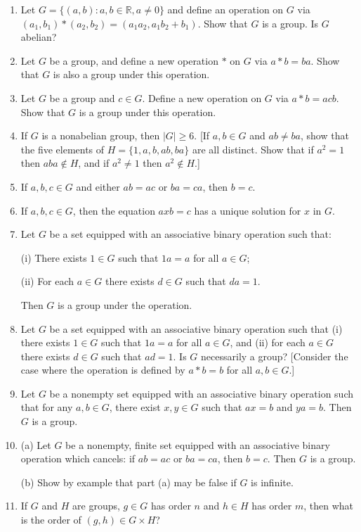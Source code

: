 \documentclass[leqno]{book}
\begin{document}
\begin{enumerate}
\item Let $G=\{(a,b):a,b\in\mathbb R,a\ne 0\}$ and define an operation on $G$ via $(a_1,b_1)*(a_2,b_2)=(a_1a_2,a_1b_2+b_1)$.  Show that $G$ is a group.  Is $G$ abelian?

\item Let $G$ be a group, and define a new operation $*$ on $G$ via $a*b=ba$.  Show that $G$ is also a group under this operation.

\item Let $G$ be a group and $c\in G$.  Define a new operation on $G$ via $a*b=acb$.  Show that $G$ is a group under this operation.

\item If $G$ is a nonabelian group, then $|G|\geqslant 6$.  [If $a,b\in G$ and $ab\ne ba$, show that the five elements of $H=\{1,a,b,ab,ba\}$ are all distinct.  Show that if $a^2=1$ then $aba\notin H$, and if $a^2\ne 1$ then $a^2\notin H$.]

\item If $a,b,c\in G$ and either $ab=ac$ or $ba=ca$, then $b=c$.

\item If $a,b,c\in G$, then the equation $axb=c$ has a unique solution for $x$ in $G$.

\item Let $G$ be a set equipped with an associative binary operation such that:

(i) There exists $1\in G$ such that $1a=a$ for all $a\in G$;

(ii) For each $a\in G$ there exists $d\in G$ such that $da=1$.

Then $G$ is a group under the operation.

\item Let $G$ be a set equipped with an associative binary operation such that (i) there exists $1\in G$ such that $1a=a$ for all $a\in G$, and (ii) for each $a\in G$ there exists $d\in G$ such that $ad=1$.  Is $G$ necessarily a group?  [Consider the case where the operation is defined by $a*b=b$ for all $a,b\in G$.]

\item Let $G$ be a nonempty set equipped with an associative binary operation such that for any $a,b\in G$, there exist $x,y\in G$ such that $ax=b$ and $ya=b$.  Then $G$ is a group.

\item (a) Let $G$ be a nonempty, finite set equipped with an associative binary operation which cancels: if $ab=ac$ or $ba=ca$, then $b=c$.  Then $G$ is a group.

(b) Show by example that part (a) may be false if $G$ is infinite.

\item If $G$ and $H$ are groups, $g\in G$ has order $n$ and $h\in H$ has order $m$, then what is the order of $(g,h)\in G\times H$?
\end{enumerate}
\end{document}
